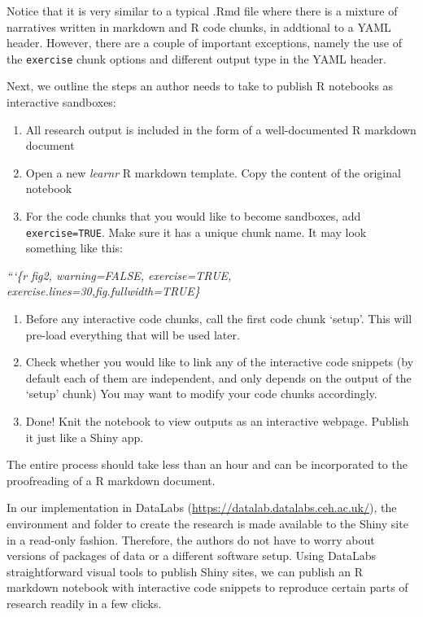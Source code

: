 Notice that it is very similar to a typical .Rmd file where there is a
mixture of narratives written in markdown and R code chunks, in
addtional to a YAML header. However, there are a couple of important
exceptions, namely the use of the \texttt{exercise} chunk options and
different output type in the YAML header.

Next, we outline the steps an author needs to take to publish R
notebooks as interactive sandboxes:

\begin{enumerate}
\def\labelenumi{\arabic{enumi}.}
\tightlist
\item
  All research output is included in the form of a well-documented R
  markdown document
\item
  Open a new \emph{learnr} R markdown template. Copy the content of the
  original notebook
\item
  For the code chunks that you would like to become sandboxes, add
  \texttt{exercise=TRUE}. Make sure it has a unique chunk name. It may
  look something like this:
\end{enumerate}

\emph{```\{r fig2, warning=FALSE, exercise=TRUE,
exercise.lines=30,fig.fullwidth=TRUE\}}

\begin{enumerate}
\def\labelenumi{\arabic{enumi}.}
\setcounter{enumi}{3}
\tightlist
\item
  Before any interactive code chunks, call the first code chunk `setup'.
  This will pre-load everything that will be used later.
\item
  Check whether you would like to link any of the interactive code
  snippets (by default each of them are independent, and only depends on
  the output of the `setup' chunk) You may want to modify your code
  chunks accordingly.
\item
  Done! Knit the notebook to view outputs as an interactive webpage.
  Publish it just like a Shiny app.
\end{enumerate}

The entire process should take less than an hour and can be incorporated
to the proofreading of a R markdown document.

In our implementation in DataLabs
(\url{https://datalab.datalabs.ceh.ac.uk/}), the environment and folder
to create the research is made available to the Shiny site in a
read-only fashion. Therefore, the authors do not have to worry about
versions of packages of data or a different software setup. Using
DataLabs straightforward visual tools to publish Shiny sites, we can
publish an R markdown notebook with interactive code snippets to
reproduce certain parts of research readily in a few clicks.


